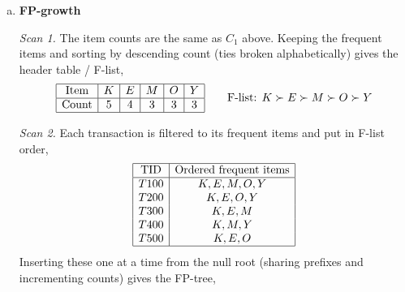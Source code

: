 \documentclass[12pt,letterpaper, onecolumn]{exam}
\begin{document}
\begin{questions}
\begin{solution}
\begin{enumerate}[a.)]
            \item \textbf{FP-growth}

            \textit{Scan 1.} The item counts are the same as $C_1$ above. Keeping the frequent items and sorting by descending count (ties broken alphabetically) gives the header table / F-list,
            \begin{equation*}
                \begin{array}{|c|c|c|c|c|c|}
                    \hline \text{Item} & K & E & M & O & Y \\ \hline
                    \text{Count} & 5 & 4 & 3 & 3 & 3 \\ \hline
                \end{array}
                \qquad \text{F-list: } K \succ E \succ M \succ O \succ Y
            \end{equation*}

            \textit{Scan 2.} Each transaction is filtered to its frequent items and put in F-list order,
            \begin{equation*}
                \begin{array}{|c|c|}
                    \hline \text{TID} & \text{Ordered frequent items} \\ \hline
                    T100 & K, E, M, O, Y \\
                    T200 & K, E, O, Y \\
                    T300 & K, E, M \\
                    T400 & K, M, Y \\
                    T500 & K, E, O \\ \hline
                \end{array}
            \end{equation*}
            Inserting these one at a time from the null root (sharing prefixes and incrementing counts) gives the FP-tree,
            \begin{center}
                \label{fig:Q2_fptree}
            \end{center}


\end{enumerate}
\end{solution}
\end{questions}
\end{document}
